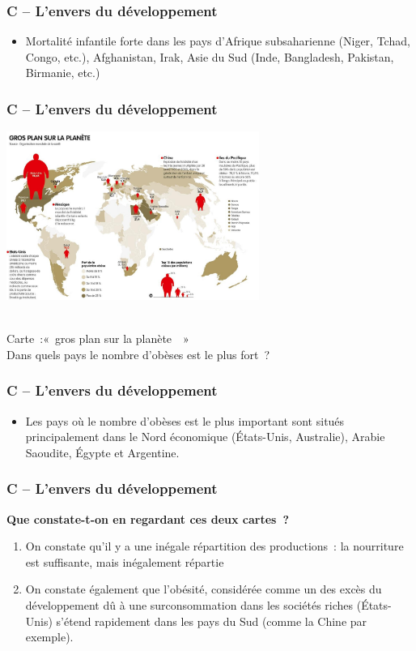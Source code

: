 \documentclass[C]{beamer}
\begin{document}
	\begin{frame}
	\frametitle{C -- L'envers du développement}
	\begin{itemize}
	\item Mortalité infantile forte dans les pays d'Afrique subsaharienne (Niger, Tchad, Congo, etc.), Afghanistan, Irak, Asie du Sud (Inde, Bangladesh, Pakistan, Birmanie, etc.)
	\end{itemize}
	\end{frame}
	
	\begin{frame}
	\frametitle{C -- L'envers du développement}
	\begin{center}
	\includegraphics[height=5.5cm]{images/carte_1_05.jpg}
	\end{center}
\\
Carte~:«~gros plan sur la planète~~»
\\
Dans quels pays le nombre d'obèses est le plus fort~?
	\end{frame}
	
	\begin{frame}
	\frametitle{C -- L'envers du développement}
	\begin{itemize}
	\item Les pays où le nombre d'obèses est le plus important sont situés principalement dans le Nord économique (\'Etats-Unis, Australie), Arabie Saoudite, \'Egypte et Argentine.
	\end{itemize}
	\end{frame}
	
	\begin{frame}
	\frametitle{C -- L'envers du développement}
	\begin{center}
	\textbf{Que constate-t-on en regardant ces deux cartes~?}
	\end{center}
	\begin{enumerate}
	\item On constate qu'il y a une inégale répartition des productions~: la nourriture est suffisante, mais inégalement répartie
	\item On constate également que l'obésité, considérée comme un des excès du développement dû à une surconsommation dans les sociétés riches (\'Etats-Unis) s'étend rapidement dans les pays du Sud (comme la Chine par exemple).
	\end{enumerate}
	\end{frame}
	
\end{document}
